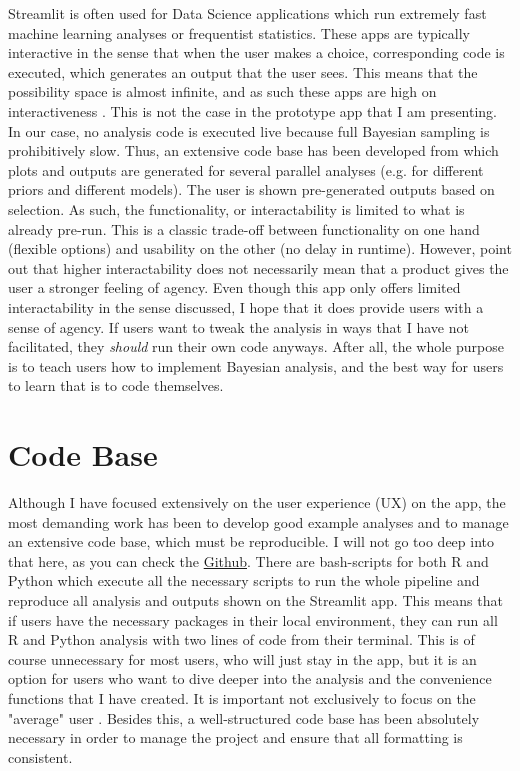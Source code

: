 \documentclass[12pt]{article}
\begin{document}
Streamlit is often used for Data Science applications which run extremely
fast machine learning analyses or frequentist statistics. These apps are typically
interactive in the sense that when the user makes a choice, corresponding code
is executed,
which generates an output that the user sees. This means that the possibility space is almost
infinite, and as such these apps are high on interactiveness
\autocite{janlert2017meaning}. This is not the case in the prototype app that
I am presenting. In our case, no analysis code is executed live because full
Bayesian sampling is prohibitively slow. Thus, an extensive code base has been
developed from which plots and outputs are generated for several parallel analyses
(e.g. for different priors and different models). The user is shown
pre-generated outputs based on
selection. As such, the functionality, or interactability is limited to what is
already pre-run. This is a classic trade-off between functionality on one
hand (flexible options) and usability on the other (no delay in runtime).
However, \textcite{janlert2017meaning} point out that higher interactability
does not necessarily mean that a product gives the user a stronger feeling of
agency. Even though this
app only offers limited interactability in the sense discussed,
I hope that it does provide users with a
sense of agency. If users want to tweak the analysis in ways that I have not
facilitated, they \emph{should} run their own code anyways. After all, the whole
purpose is to teach users how to implement Bayesian analysis,
and the best way for users to learn that is to code themselves.

\section{Code Base}
Although I have focused extensively on the user experience (UX) on the app,
the most demanding work has been to develop good example analyses and to manage an extensive
code base, which must be reproducible. I will not go too deep into that here,
as you can check the
\href{https://github.com/victor-m-p/BayesWorkflow}{Github}.
There are bash-scripts for both R and Python
which execute all the necessary scripts to run the whole pipeline
and reproduce all analysis and outputs shown on the Streamlit app. This means that if users have
the necessary packages in their local environment, they can run all R and Python analysis
with two lines of code from their terminal. This is of course unnecessary for most users,
who will just stay in the app, but it is an option for users who want to dive deeper
into the analysis and the convenience functions that I have created. It is
important not exclusively to focus on the "average" user
\autocite[14]{mills1992macintosh}.
Besides this, a well-structured code base has been absolutely necessary
in order to manage the project and ensure that all formatting is consistent.
\end{document}
